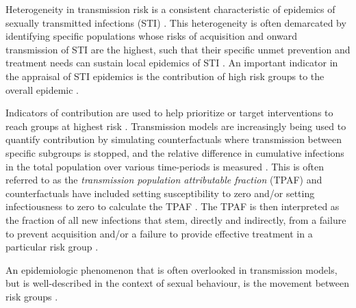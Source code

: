 Heterogeneity in transmission risk is a consistent characteristic of
epidemics of sexually transmitted infections (STI) \citep{Anderson1991}.
This heterogeneity is often demarcated by identifying
specific populations whose risks of acquisition and onward transmission of STI are the highest,
such that their specific unmet prevention and treatment needs
can sustain local epidemics of STI \citep{Yorke1978}.
An important indicator in the appraisal of STI epidemics is
the contribution of high risk groups to the overall epidemic \citep{Case2012}.
\par
Indicators of contribution are used to help prioritize or target interventions
to reach groups at highest risk \citep{Case2012,Shubber2014}.
Transmission models are increasingly being used to quantify
contribution by simulating counterfactuals where transmission 
between specific subgroups is stopped, and
the relative difference in cumulative infections in the total population
over various time-periods is measured \citep{Mishra2016,Mukandavire2018}.
This is often referred to as the
\textit{transmission population attributable fraction} (TPAF)
and counterfactuals have included
setting susceptibility to zero and/or setting 
infectiousness to zero to calculate the TPAF \citep{Mishra2012}.
The TPAF is then interpreted as
the fraction of all new infections that stem, directly and indirectly, from
a failure to prevent acquisition and/or
a failure to provide effective treatment in a particular risk group \citep{Mishra2016}.
\par
An epidemiologic phenomenon that is often overlooked in transmission models,
but is well-described in the context of sexual behaviour,
is the movement between risk groups \citep{Watts2010}.

